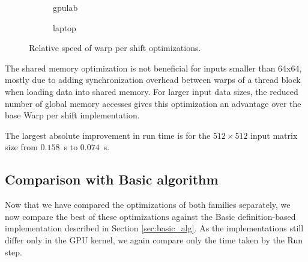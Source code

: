 \begin{figure}[ht]
	\centering	
	\begin{subfigure}{0.4\textwidth}
		\centering
		\def\svgwidth{\textwidth}
		
		\caption{gpulab}
		\label{fig:warp_per_shift_results_gpulab}
	\end{subfigure}
	\begin{subfigure}{0.4\textwidth}
		\centering
		\def\svgwidth{\textwidth}
		
		\caption{laptop}
		\label{fig:warp_per_shift_results_laptop}
	\end{subfigure}
	\caption{Relative speed of warp per shift optimizations.}
	\label{fig:warp_per_shift_results}
\end{figure}

The shared memory optimization is not beneficial for inputs smaller than 64x64, mostly due to adding synchronization overhead between warps of a thread block when loading data into shared memory. For larger input data sizes, the reduced number of global memory accesses gives this optimization an advantage over the base Warp per shift implementation.

The largest absolute improvement in run time is for the $512 \times 512$ input matrix size from $0.158$~s to $0.074$~s.



\subsection{Comparison with Basic algorithm}
\label{sec:comparison_with_basic}

Now that we have compared the optimizations of both families separately, we now compare the best of these optimizations against the Basic definition-based implementation described in Section \ref{sec:basic_alg}. As the implementations still differ only in the GPU kernel, we again compare only the time taken by the Run step.


